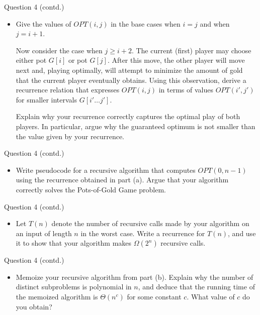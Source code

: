 \documentclass{beamer}
\begin{document}
\begin{frame}{Question 4 (contd.)}
\begin{itemize}
  \item[(a)] Give the values of $OPT(i,j)$ in the base cases when $i = j$ and when $j = i+1$.

  Now consider the case when $j \geq i+2$. The current (first) player may choose either pot $G[i]$ or pot $G[j]$. After this move, the other player will move next and, playing optimally, will attempt to minimize the amount of gold that the current player eventually obtains. Using this observation, derive a recurrence relation that expresses $OPT(i,j)$ in terms of values $OPT(i', j')$ for smaller intervals $G[i'\ldots j']$.

  Explain why your recurrence correctly captures the optimal play of both players. In particular, argue why the guaranteed optimum is not smaller than the value given by your recurrence.
\end{itemize}
\end{frame}

\begin{frame}{Question 4 (contd.)}
\begin{itemize}
  \item[(b)] Write pseudocode for a recursive algorithm that computes $OPT(0, n-1)$ using the recurrence obtained in part (a). Argue that your algorithm correctly solves the Pots-of-Gold Game problem.
\end{itemize}
\end{frame}

\begin{frame}{Question 4 (contd.)}
\begin{itemize}
  \item[(c)] Let $T(n)$ denote the number of recursive calls made by your algorithm on an input of length $n$ in the worst case. Write a recurrence for $T(n)$, and use it to show that your algorithm makes $\Omega(2^n)$ recursive calls.
\end{itemize}
\end{frame}

\begin{frame}{Question 4 (contd.)}
\begin{itemize}
  \item[(d)] Memoize your recursive algorithm from part (b). Explain why the number of distinct subproblems is polynomial in $n$, and deduce that the running time of the memoized algorithm is $\Theta(n^c)$ for some constant $c$. What value of $c$ do you obtain?
\end{itemize}
\end{frame}
\end{document}
